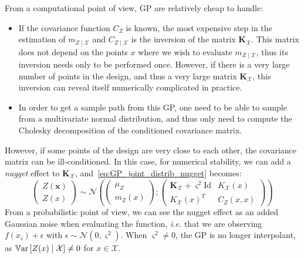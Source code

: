 \documentclass[../../Main_ManuscritThese.tex]{subfiles}
\begin{document}
From a computational point of view, GP are relatively cheap to handle:
\begin{itemize}
\item If the covariance function $C_Z$ is known, the most expensive step in the estimation of $m_{Z\mid \mathcal{X}}$ and $C_{Z \mid \mathcal{X}}$ is the inversion of the matrix $\mathbf{K}_{\mathcal{X}}$. This matrix does not depend on the points $x$ where we wish to evaluate $m_{Z\mid \mathcal{X}}$, thus its inversion needs only to be performed once. However, if there is a very large number of points in the design, and thus a very large matrix $\mathbf{K}_{\mathcal{X}}$, this inversion can reveal itself numerically complicated in practice. %
\item In order to get a sample path from this GP, one need to be able to sample from a multivariate normal distribution, and thus only need to compute the Cholesky decomposition of the conditioned covariance matrix.
\end{itemize}
However, if some points of the design are very close to each other, the covariance matrix can be ill-conditioned. In this case,
for numerical stability, we can add a \emph{nugget} effect to $\mathbf{K}_{\mathcal{X}}$, and~\eqref{eq:GP_joint_distrib_nugget} becomes:
\begin{equation}
  \label{eq:GP_joint_distrib_nugget}
  \begin{pmatrix}
    Z(\mathbf{x}) \\
    Z(x)
  \end{pmatrix} \sim
  \mathcal{N}\left(
    \begin{pmatrix}
      \mu_Z \\
      m_{Z}(x)
    \end{pmatrix} ;
    \begin{pmatrix}
      \mathbf{K}_{\mathcal{X}} + \varsigma^2\mathrm{Id}& K_{\mathcal{X}}(x) \\
       K_{\mathcal{X}}(x)^T & C_Z(x, x)
    \end{pmatrix}
\right)
\end{equation}
From a probabilistic point of view, we can see the nugget effect as an
added Gaussian noise when evaluating the function, \emph{i.e.} that we
are observing $f(x_i)+\epsilon$ with
$\epsilon \sim \mathcal{N}(0, \varsigma^2)$. When
$\varsigma^2 \neq 0$, the GP is no longer interpolant, as
$\mathbb{V}\mathrm{ar}\left[Z(x) \mid \mathcal{X}\right] \neq 0$ for
$x\in \mathcal{X}$.
\end{document}
